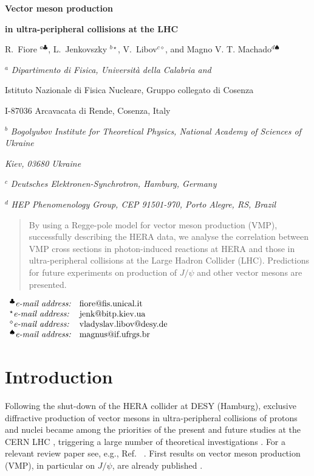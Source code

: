 \documentclass[12pt]{article}
\begin{document}
\vskip 0.5cm \centerline{\bf\Large Vector meson production}
\centerline{\bf\Large in ultra-peripheral collisions at the LHC}  \vskip 0.3cm
\centerline{R.~Fiore $^{a\clubsuit}$, L.~Jenkovszky $^{b\star}$, V.~Libov$^{c\diamond}$, and Magno V. T. Machado$^{d\spadesuit}$}

\vskip 1cm

\centerline{$^a$ \sl Dipartimento di Fisica, Universit\`a  della Calabria and}
\centerline{Istituto Nazionale di Fisica Nucleare, Gruppo collegato di Cosenza}
\centerline{I-87036 Arcavacata di Rende, Cosenza, Italy}
\centerline{$^b$ \sl Bogolyubov Institute for Theoretical Physics,
National Academy of Sciences of Ukraine} \centerline{\sl Kiev,
03680 Ukraine}
\centerline{$^c$ \sl Deutsches Elektronen-Synchrotron, Hamburg, Germany}
\centerline{$^d$ \sl HEP Phenomenology Group, CEP 91501-970, Porto Alegre, RS, Brazil}
\vskip
0.1cm

\begin{abstract}\noindent
By using a Regge-pole model for vector meson production (VMP), successfully describing the HERA data, we analyse the correlation between VMP cross sections in photon-induced reactions at HERA and those in ultra-peripheral collisions at the Large Hadron Collider (LHC).
Predictions for future experiments on production of $J/\psi$ and other vector mesons are presented.
\end{abstract}

\vskip 0.1cm

$
\begin{array}{ll}
^{\clubsuit}\mbox{{\it e-mail address:}} &
\mbox{fiore@fis.unical.it}\\
^{\star}\mbox{{\it e-mail address:}} &
   \mbox{jenk@bitp.kiev.ua} \\
^{\diamond}\mbox{{\it e-mail address:}} &
   \mbox{vladyslav.libov@desy.de} \\
 ^{\spadesuit}\mbox{{\it e-mail address:}} &
\mbox{magnus@if.ufrgs.br}\\  

\end{array}
$


\section{Introduction}\label{Int}

Following the shut-down of the HERA collider at DESY (Hamburg), exclusive diffractive production of vector mesons in ultra-peripheral collisions of protons and nuclei became among the priorities of the present and future studies at the CERN LHC \cite{LHCb1, LHCb2, LHCA_ATLAS}, triggering a large number of theoretical investigations \cite{Schafer, Brazil, Ryskin, Motyka, Szczurek}.
For a relevant review paper see, e.g., Ref.~ \cite{Review}.
First results on vector meson production (VMP), in particular on $J/\psi$, are already published \cite{LHCb1, LHCb2}.
\end{document}
